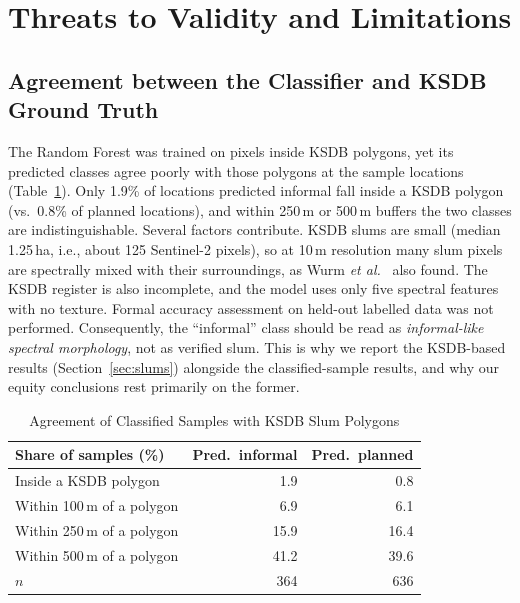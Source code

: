 \documentclass[conference]{IEEEtran}
\newcommand{\m}{\,m}
\begin{document}
\section{Threats to Validity and Limitations}\label{sec:validity}
\subsection{Agreement between the Classifier and KSDB Ground Truth}
The Random Forest was trained on pixels inside KSDB polygons, yet its predicted classes agree poorly with those polygons at the sample locations (Table~\ref{tab:agree}). Only 1.9\% of locations predicted informal fall inside a KSDB polygon (vs.\ 0.8\% of planned locations), and within 250\m{} or 500\m{} buffers the two classes are indistinguishable. Several factors contribute. KSDB slums are small (median 1.25\,ha, i.e., about 125 Sentinel-2 pixels), so at 10\m{} resolution many slum pixels are spectrally mixed with their surroundings, as Wurm \textit{et al.}\ \cite{wurm2019} also found. The KSDB register is also incomplete, and the model uses only five spectral features with no texture. Formal accuracy assessment on held-out labelled data was not performed. Consequently, the ``informal'' class should be read as \emph{informal-like spectral morphology}, not as verified slum. This is why we report the KSDB-based results (Section~\ref{sec:slums}) alongside the classified-sample results, and why our equity conclusions rest primarily on the former.

\begin{table}[!t]
\centering
\caption{Agreement of Classified Samples with KSDB Slum Polygons}
\label{tab:agree}
\footnotesize
\begin{tabular}{@{}lrr@{}}
\toprule
\textbf{Share of samples (\%)} & \textbf{Pred.\ informal} & \textbf{Pred.\ planned} \\
\midrule
Inside a KSDB polygon & 1.9 & 0.8 \\
Within 100\m{} of a polygon & 6.9 & 6.1 \\
Within 250\m{} of a polygon & 15.9 & 16.4 \\
Within 500\m{} of a polygon & 41.2 & 39.6 \\
\midrule
$n$ & 364 & 636 \\
\bottomrule
\end{tabular}
\end{table}
\end{document}
